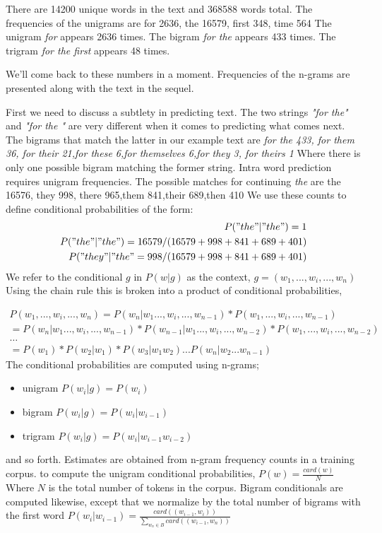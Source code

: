 There are 14200 unique words in the text and 368588 words total.  The frequencies of the unigrams are
{for 2636, the 16579, first 348, time 564}
The unigram \emph{for} appears 2636 times.
The bigram \emph{for the} appears 433 times.
The trigram \emph{for the first} appears 48 times.

We'll come back to these numbers in a moment. Frequencies of the n-grams are presented along with the text in the sequel.

First we need to discuss a subtlety in predicting text.  The two strings \emph{"for the"} and \emph{"for the " } are very different when it comes to predicting what comes next.  The bigrams that match the latter in our example text are
\emph{{for the 433, for them 36, for their 21,for these 6,for themselves 6,for they 3, for theirs 1}}
Where there is only one possible bigram matching the former string. Intra word prediction requires unigram frequencies. The possible matches for continuing \emph{the} are {the 16576, they 998, there 965,them 841,their 689,then 410} We use these counts to define conditional probabilities of the form:
\begin{eqnarray*}
P("the" | "the ") =1 \\
P("the" | "the") = 16579/(16579+998+841+689+401) \\
P("they" | "the" = 998/(16579+998+841+689+401)
\end{eqnarray*}
We refer to the conditional $g$ in $P(w|g)$ as the context, $ g= (w_{1}, ...,w_{i},...,w_{n})$  Using the chain rule this is broken into a product of conditional probabilities,

\begin{eqnarray*}
P(w_{1}, ...,w_{i},...,w_{n}) = P(w_{n}|w_{1} ...,w_{i},...,w_{n-1}) * P(w_{1}, ...,w_{i},...,w_{n-1}) \\
 = P(w_{n}|w_{1} ...,w_{i},...,w_{n-1}) * P(w_{n-1}|w_{1} ...,w_{i},...,w_{n-2}) * P(w_{1}, ...,w_{i},...,w_{n-2})\\
\ldots \\
= P(w_{1}) * P(w_{2} | w_{1}) * P(w_{3} | w_{1} w_{2}) ... P(w_{n} | w_{2} ...w_{n-1})
\end{eqnarray*}
The conditional probabilities are computed using n-grams;
\begin{itemize}
\item unigram $P(w_{i} | g) = P(w_{i})$ \\
\item bigram  $P(w_{i} | g) = P(w_{i} | w_{i-1})$ \\
\item trigram $P(w_{i} | g) =  P(w_{i} | w_{i-1} w_{i-2})$
\end{itemize}
and so forth.  Estimates are obtained from n-gram frequency counts in a training corpus.
to compute the unigram conditional probabilities, $P(w) =  \frac{card(w) }{N}$ Where $N$ is the total number of tokens in the corpus. Bigram conditionals are computed likewise, except that we normalize by the total number of bigrams with the first word $P(w_{i} | w_{i-1}) =  \frac{card( (w_{i-1},w_{i}) ) }{\sum\limits_{w_{n} \in B} card( (w_{i-1},w_{n}))}$

